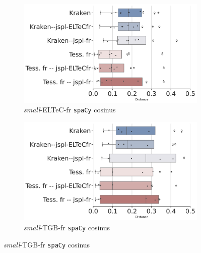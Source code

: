 \begin{figure}[h!]

    \begin{subfigure}{0.45\textwidth}
  \includegraphics[height=.58\textwidth]{REVUETAL_article_23102023/IMAGES/Boite-a_moustache_12072024/ELTeC_fra_spaCy3.5.1/ELTeC_fra_spaCy3.5.1-lg-cosinus-sim2-3.png} 
        \caption{\textit{small}-ELTeC-fr \texttt{spaCy} cosinus}
        \label{fig:ELTeC-Fra_spaCy-cosinus}
   \end{subfigure}
        \begin{subfigure}{0.45\textwidth}
  \includegraphics[height=.58\textwidth]{REVUETAL_article_23102023/IMAGES/Boite-a_moustache_12072024/TGB_spaCy3.5.1/DATA_TGB-2023_spaCy3.5.1_Distance-lg-cosinus-sim2-3.png} 
        \caption{\textit{small}-TGB-fr \texttt{spaCy} cosinus}
                \label{fig:TGB_spaCy-cosinus}
   \end{subfigure}
   

\end{figure}
